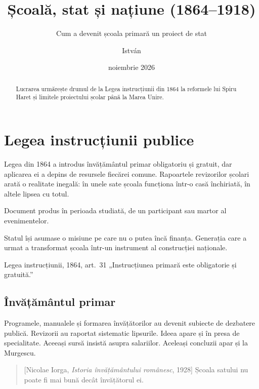 \documentclass[notes=margin]{texign-article}
\title{Școală, stat și națiune (1864–1918)}
\subtitle{Cum a devenit școala primară un proiect de stat}
\author{István}
\date{noiembrie 2026}
\begin{document}
\maketitle

\begin{abstract}
Lucrarea urmărește drumul de la Legea instrucțiunii din 1864 la reformele lui Spiru Haret și limitele proiectului școlar până la Marea Unire.
\end{abstract}

\section{Legea instrucțiunii publice}
Legea din 1864 a introdus învățământul primar obligatoriu și gratuit\cite[art.~31]{lege1864}, dar aplicarea ei a depins de resursele fiecărei comune. Rapoartele revizorilor școlari arată o realitate inegală: în unele sate școala funcționa într-o casă închiriată, în altele lipsea cu totul\cite[112]{murgescu2010}.

\begin{definition}
Document produs în perioada studiată, de un participant sau martor al evenimentelor.
\end{definition}

Statul își asumase o misiune pe care nu o putea încă finanța. Generația care a urmat a transformat școala într-un instrument al construcției naționale.


\begin{source}{Legea instrucțiunii, 1864, art.~31}
„Instrucțiunea primară este obligatorie și gratuită.”
\end{source}

\subsection{Învățământul primar}
Programele, manualele și formarea învățătorilor au devenit subiecte de dezbatere publică\cite[45--48]{iorga1928}. Revizorii au raportat sistematic lipsurile\cite{raport1872}. Ideea apare și în presa de specialitate\cite[14]{popescu1929}. Aceeași sursă insistă asupra salariilor\cite[16]{popescu1929}. Aceleași concluzii apar și la Murgescu\cite[114]{murgescu2010}.

\begin{quotation}[Nicolae Iorga, \emph{Istoria învățământului românesc}, 1928]
Școala satului nu poate fi mai bună decât învățătorul ei.
\end{quotation}
\end{document}
